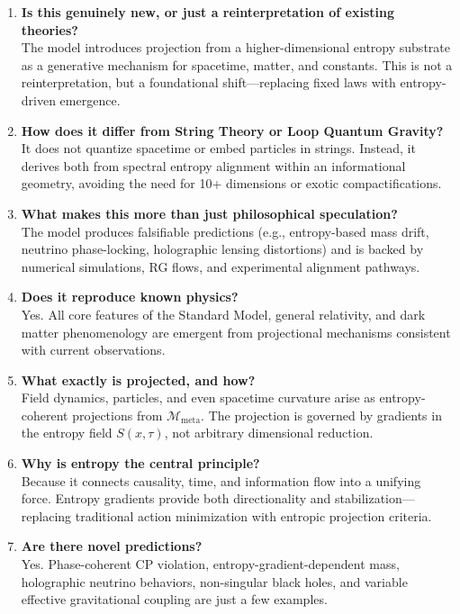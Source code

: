 \documentclass[10.5pt,a4paper]{article}
\begin{document}
\begin{enumerate}
    \item \textbf{Is this genuinely new, or just a reinterpretation of existing theories?}\\
    The model introduces projection from a higher-dimensional entropy substrate as a generative mechanism for spacetime, matter, and constants. This is not a reinterpretation, but a foundational shift—replacing fixed laws with entropy-driven emergence.
    
    \item \textbf{How does it differ from String Theory or Loop Quantum Gravity?}\\
    It does not quantize spacetime or embed particles in strings. Instead, it derives both from spectral entropy alignment within an informational geometry, avoiding the need for 10+ dimensions or exotic compactifications.
    
    \item \textbf{What makes this more than just philosophical speculation?}\\
    The model produces falsifiable predictions (e.g., entropy-based mass drift, neutrino phase-locking, holographic lensing distortions) and is backed by numerical simulations, RG flows, and experimental alignment pathways.
    
    \item \textbf{Does it reproduce known physics?}\\
    Yes. All core features of the Standard Model, general relativity, and dark matter phenomenology are emergent from projectional mechanisms consistent with current observations.
    
    \item \textbf{What exactly is projected, and how?}\\
    Field dynamics, particles, and even spacetime curvature arise as entropy-coherent projections from \( \mathcal{M}_{\text{meta}} \). The projection is governed by gradients in the entropy field \( S(x,\tau) \), not arbitrary dimensional reduction.
    
    \item \textbf{Why is entropy the central principle?}\\
    Because it connects causality, time, and information flow into a unifying force. Entropy gradients provide both directionality and stabilization—replacing traditional action minimization with entropic projection criteria.
    
    \item \textbf{Are there novel predictions?}\\
    Yes. Phase-coherent CP violation, entropy-gradient-dependent mass, holographic neutrino behaviors, non-singular black holes, and variable effective gravitational coupling are just a few examples.
    

\end{enumerate}
\end{document}
